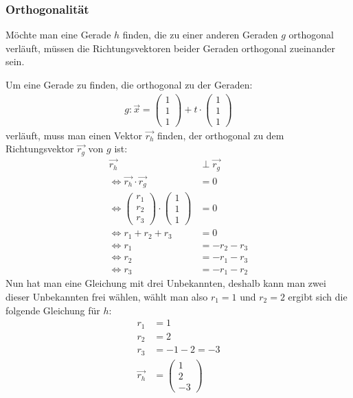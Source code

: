 \subsubsection{Orthogonalität}
\begin{flushleft}
Möchte man eine Gerade $h$ finden, die zu einer anderen Geraden $g$ orthogonal verläuft, müssen die Richtungsvektoren beider Geraden orthogonal zueinander sein.

Um eine Gerade zu finden, die orthogonal zu der Geraden:
\begin{align}
    g\colon\vec{x}=\begin{pmatrix} 1 \\ 1 \\ 1 \end{pmatrix}+t\cdot\begin{pmatrix} 1 \\ 1 \\ 1 \end{pmatrix}
\end{align}
verläuft, muss man einen Vektor $\vec{r_h}$ finden, der orthogonal zu dem Richtungsvektor $\vec{r_g}$ von $g$ ist:
\begin{align}
    \vec{r_h}&\perp\vec{r_g} \\
    \Leftrightarrow \vec{r_h}\cdot\vec{r_g}&=0 \\
    \Leftrightarrow \begin{pmatrix} r_1 \\ r_2 \\ r_3 \end{pmatrix}\cdot\begin{pmatrix} 1 \\ 1 \\ 1 \end{pmatrix}&=0 \\
    \Leftrightarrow r_1+r_2+r_3&=0 \\
    \Leftrightarrow r_1&=-r_2-r_3 \\
    \Leftrightarrow r_2&=-r_1-r_3 \\
    \Leftrightarrow r_3&=-r_1-r_2
\end{align}
Nun hat man eine Gleichung mit drei Unbekannten, deshalb kann man zwei dieser Unbekannten frei wählen, wählt man also $r_1=1$ und $r_2=2$ ergibt sich die folgende Gleichung für $h$:
\begin{align}
    r_1&=1 \\
    r_2&=2 \\
    r_3&=-1-2=-3 \\
    \vec{r_h}&=\begin{pmatrix} 1 \\ 2 \\ -3 \end{pmatrix} \\

\end{align}
\end{flushleft}
